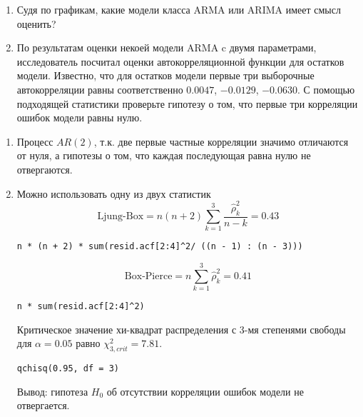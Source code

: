 \begin{problem}
\begin{enumerate}
\item Судя по графикам, какие модели класса ARMA или ARIMA имеет смысл оценить?
\item По результатам оценки некоей модели ARMA c двумя параметрами, исследователь посчитал оценки автокорреляционной функции для остатков модели. Известно, что для остатков модели первые три выборочные автокорреляции равны соответственно $0.0047$, $-0.0129$, $-0.0630$.
С помощью подходящей статистики проверьте гипотезу о том, что первые три корреляции ошибок модели равны нулю.
\end{enumerate}


\begin{sol}
\begin{enumerate}
\item Процесс $AR(2)$, т.к. две первые частные корреляции значимо отличаются от нуля, а гипотезы о том, что каждая последующая равна нулю не отвергаются.
\item Можно использовать одну из двух статистик
\[
\text{Ljung-Box}=n(n+2)\sum_{k=1}^3\frac{\hat{\rho}_k^2}{n-k}=0.43
\]

\begin{verbatim}
n * (n + 2) * sum(resid.acf[2:4]^2/ ((n - 1) : (n - 3)))
\end{verbatim}


\[
\text{Box-Pierce}=n\sum_{k=1}^3\hat{\rho}_k^2=0.41
\]

\begin{verbatim}
n * sum(resid.acf[2:4]^2)
\end{verbatim}

Критическое значение хи-квадрат распределения с 3-мя степенями свободы для $\alpha=0.05$ равно $\chi^2_{3,crit}=7.81$.

\begin{verbatim}
qchisq(0.95, df = 3)
\end{verbatim}

Вывод: гипотеза $H_0$ об отсутствии корреляции ошибок модели не отвергается.
\end{enumerate}
\end{sol}
\end{problem}






